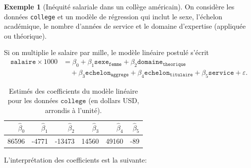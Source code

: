 \documentclass[
  11pt,
  letterpaper,
]{article}
\theoremstyle{definition}
\theoremstyle{definition}
\newtheorem{example}{Exemple}[section]
\theoremstyle{definition}
\theoremstyle{remark}
\begin{document}
\begin{example}[Inéquité salariale dans un collège américain]
\protect\hypertarget{exm:inequite-salariale}{}{\label{exm:inequite-salariale} {} }On considère les données \texttt{college} et un modèle de régression qui inclut le sexe, l'échelon académique, le nombre d'années de service et le domaine d'expertise (appliquée ou théorique).
\end{example}

Si on multiplie le salaire par mille, le modèle linéaire postulé s'écrit
\begin{align*}
\texttt{salaire} \times 1000 &= \beta_0 + \beta_1 \texttt{sexe}_{\texttt{femme}} +\beta_2 \texttt{domaine}_{\texttt{theorique}} \\&\quad +\beta_3 \texttt{echelon}_{\texttt{aggrege}}
+\beta_4 \texttt{echelon}_{\texttt{titulaire}}  +\beta_5 \texttt{service} + \varepsilon.
\end{align*}

\begin{table}

\caption{\label{tab:collegecoefs}Estimés des coefficients du modèle linéaire pour les données $\texttt{college}$ (en dollars USD, arrondis à l'unité).}
\centering
\begin{tabular}[t]{rrrrrr}
\toprule
$\widehat{\beta}_0$ & $\widehat{\beta}_1$ & $\widehat{\beta}_2$ & $\widehat{\beta}_3$ & $\widehat{\beta}_4$ & $\widehat{\beta}_5$\\
\midrule
86596 & -4771 & -13473 & 14560 & 49160 & -89\\
\bottomrule
\end{tabular}
\end{table}

L'interprétation des coefficients est la suivante:
\end{document}
